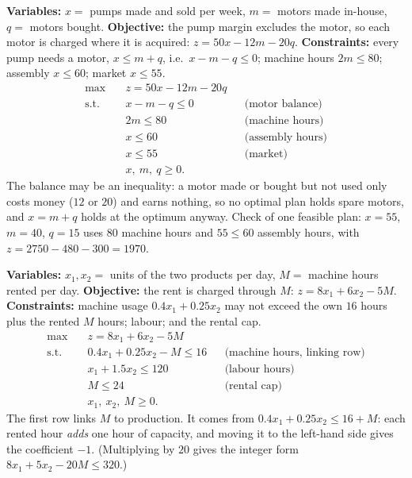 \begin{solutions}
  \item \textbf{Variables:} $x=$ pumps made and sold per week, $m=$ motors
        made in-house, $q=$ motors bought. \textbf{Objective:} the pump
        margin excludes the motor, so each motor is charged where it is
        acquired: $z=50x-12m-20q$. \textbf{Constraints:} every pump needs a
        motor, $x\le m+q$, i.e.\ $x-m-q\le 0$; machine hours $2m\le 80$;
        assembly $x\le 60$; market $x\le 55$.
        \[
          \begin{aligned}
            \max\quad & z=50x-12m-20q\\
            \text{s.t.}\quad & x-m-q\le 0 &&\text{(motor balance)}\\
            & 2m\le 80 &&\text{(machine hours)}\\
            & x\le 60 &&\text{(assembly hours)}\\
            & x\le 55 &&\text{(market)}\\
            & x,\ m,\ q\ge 0 .
          \end{aligned}
        \]
        The balance may be an inequality: a motor made or bought but not
        used only costs money ($12$ or $20$) and earns nothing, so no
        optimal plan holds spare motors, and $x=m+q$ holds at the optimum
        anyway. Check of one feasible plan: $x=55$, $m=40$, $q=15$ uses
        $80$ machine hours and $55\le 60$ assembly hours, with
        $z=2750-480-300=1970$.

  \item \textbf{Variables:} $x_1,x_2=$ units of the two products per
        day, $M=$ machine hours rented per day. \textbf{Objective:} the
        rent is charged through $M$: $z=8x_1+6x_2-5M$.
        \textbf{Constraints:} machine usage $0.4x_1+0.25x_2$ may not exceed
        the own $16$ hours plus the rented $M$ hours; labour; and the
        rental cap.
        \[
          \begin{aligned}
            \max\quad & z=8x_1+6x_2-5M\\
            \text{s.t.}\quad & 0.4x_1+0.25x_2-M\le 16 &&\text{(machine hours, linking row)}\\
            & x_1+1.5x_2\le 120 &&\text{(labour hours)}\\
            & M\le 24 &&\text{(rental cap)}\\
            & x_1,\ x_2,\ M\ge 0 .
          \end{aligned}
        \]
        The first row links $M$ to production. It comes from
        $0.4x_1+0.25x_2\le 16+M$: each rented hour \emph{adds} one hour of
        capacity, and moving it to the left-hand side gives the
        coefficient $-1$. (Multiplying by $20$ gives the integer form
        $8x_1+5x_2-20M\le 320$.)


\end{solutions}
